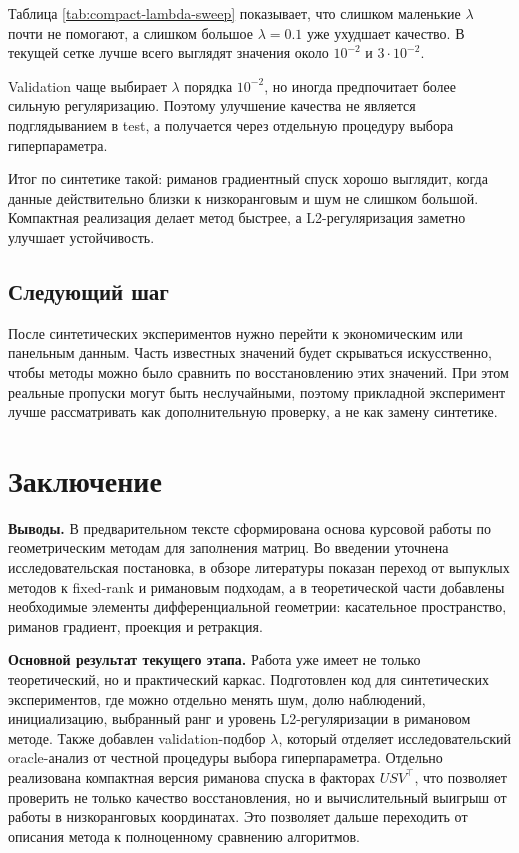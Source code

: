 \documentclass[a4paper,12pt]{article}
\begin{document}
Таблица \ref{tab:compact-lambda-sweep} показывает, что слишком маленькие $\lambda$ почти не помогают, а слишком большое $\lambda=0.1$ уже ухудшает качество. В текущей сетке лучше всего выглядят значения около $10^{-2}$ и $3\cdot 10^{-2}$.



Validation чаще выбирает $\lambda$ порядка $10^{-2}$, но иногда предпочитает более сильную регуляризацию. Поэтому улучшение качества не является подглядыванием в test, а получается через отдельную процедуру выбора гиперпараметра.



Итог по синтетике такой: риманов градиентный спуск хорошо выглядит, когда данные действительно близки к низкоранговым и шум не слишком большой. Компактная реализация делает метод быстрее, а L2-регуляризация заметно улучшает устойчивость.

\subsection{Следующий шаг}

После синтетических экспериментов нужно перейти к экономическим или панельным данным. Часть известных значений будет скрываться искусственно, чтобы методы можно было сравнить по восстановлению этих значений. При этом реальные пропуски могут быть неслучайными, поэтому прикладной эксперимент лучше рассматривать как дополнительную проверку, а не как замену синтетике.

\newpage


\section*{Заключение}
{}

\textbf{Выводы.} В предварительном тексте сформирована основа курсовой работы по геометрическим методам для заполнения матриц. Во введении уточнена исследовательская постановка, в обзоре литературы показан переход от выпуклых методов к fixed-rank и римановым подходам, а в теоретической части добавлены необходимые элементы дифференциальной геометрии: касательное пространство, риманов градиент, проекция и ретракция.

\textbf{Основной результат текущего этапа.} Работа уже имеет не только теоретический, но и практический каркас. Подготовлен код для синтетических экспериментов, где можно отдельно менять шум, долю наблюдений, инициализацию, выбранный ранг и уровень L2-регуляризации в римановом методе. Также добавлен validation-подбор $\lambda$, который отделяет исследовательский oracle-анализ от честной процедуры выбора гиперпараметра. Отдельно реализована компактная версия риманова спуска в факторах $USV^\top$, что позволяет проверить не только качество восстановления, но и вычислительный выигрыш от работы в низкоранговых координатах. Это позволяет дальше переходить от описания метода к полноценному сравнению алгоритмов.
\end{document}
